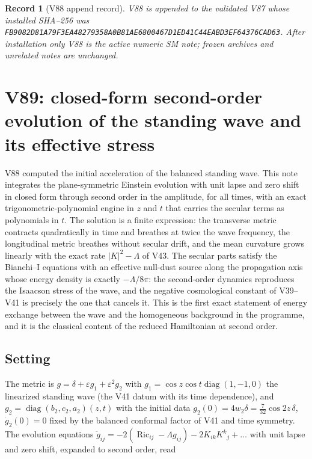\documentclass[11pt]{article}
\newtheorem{record}[theorem]{Record}
\theoremstyle{remark}
\begin{document}
\begin{record}[V88 append record]
\label{rec:v19v88}
V88 is appended to the validated V87 whose installed SHA--256 was
\texttt{FB9082D81A79F3EA48279358A0B81AE6800467D1ED41C44EABD3EF64376CAD63}.
After installation only V88 is the active numeric SM note; frozen
archives and unrelated notes are unchanged.
\end{record}


\section{V89: closed-form second-order evolution of the standing wave and its effective stress}
\label{sec:v19v89}

V88 computed the initial acceleration of the balanced standing wave.
This note integrates the plane-symmetric Einstein evolution with unit
lapse and zero shift in closed form through second order in the
amplitude, for all times, with an exact trigonometric-polynomial
engine in \(z\) and \(t\) that carries the secular terms as
polynomials in \(t\).  The solution is a finite expression: the
transverse metric contracts quadratically in time and breathes at
twice the wave frequency, the longitudinal metric breathes without
secular drift, and the mean curvature grows linearly with the exact
rate \(|K|^2-\Lambda\) of V43.  The secular parts satisfy the
Bianchi--I equations with an effective null-dust source along the
propagation axis whose energy density is exactly \(-\Lambda/8\pi\):
the second-order dynamics reproduces the Isaacson stress of the wave,
and the negative cosmological constant of V39--V41 is precisely the
one that cancels it.  This is the first exact statement of energy
exchange between the wave and the homogeneous background in the
programme, and it is the classical content of the reduced Hamiltonian
at second order.

\subsection{Setting}

The metric is \(g=\delta+\varepsilon g_1+\varepsilon^2g_2\) with
\(g_1=\cos z\cos t\operatorname{diag}(1,-1,0)\) the linearized
standing wave (the V41 datum with its time dependence), and
\(g_2=\operatorname{diag}(b_2,c_2,a_2)(z,t)\) with the initial data
\(g_2(0)=4w_2\delta=\tfrac7{32}\cos2z\,\delta\), \(\dot g_2(0)=0\)
fixed by the balanced conformal factor of V41 and time symmetry.  The
evolution equations \(\ddot g_{ij}=-2(\operatorname{Ric}_{ij}-\Lambda g_{ij})-2K_{ik}K^k{}_j+\dots\)
with unit lapse and zero shift, expanded to second order, read
\end{document}
